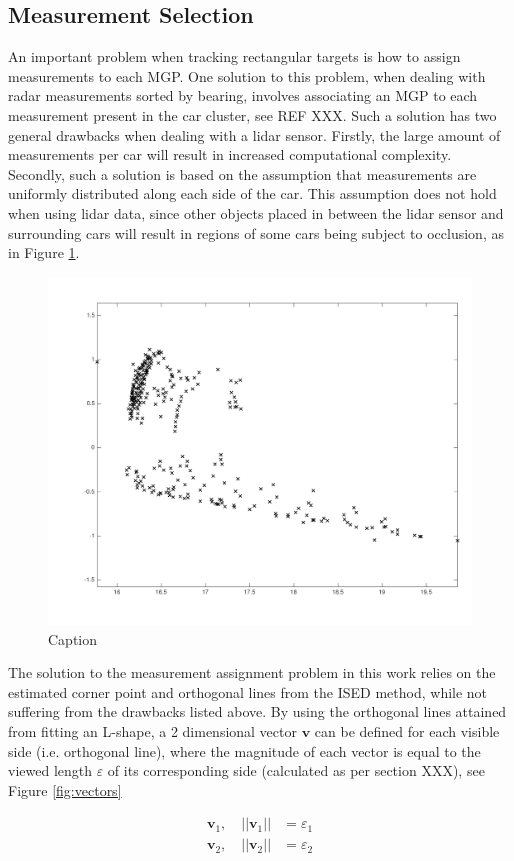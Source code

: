\subsection{Measurement Selection}
An important problem when tracking rectangular targets is how to assign measurements to each MGP. One solution to this problem, when dealing with radar measurements sorted by bearing, involves associating an MGP to each measurement present in the car cluster, see REF XXX. Such a solution has two general drawbacks when dealing with a lidar sensor. Firstly, the large amount of measurements per car will result in increased computational complexity. Secondly, such a solution is based on the assumption that measurements are uniformly distributed along each side of the car. This assumption does not hold when using lidar data, since other objects placed in between the lidar sensor and surrounding cars will result in regions of some cars being subject to occlusion, as in Figure \ref{fig:pocket}.

\begin{figure}[ht]
    \centering
    \includegraphics[width = 0.6\linewidth]{include/images/pocket.png}
    \caption{Caption}
    \label{fig:pocket}
\end{figure}

The solution to the measurement assignment problem in this work relies on the estimated corner point and orthogonal lines from the ISED method, while not suffering from the drawbacks listed above. By using the orthogonal lines attained from fitting an L-shape, a 2 dimensional vector $\mathbf{v}$ can be defined for each visible side (i.e. orthogonal line), where the magnitude of each vector is equal to the viewed length $\varepsilon$ of its corresponding side (calculated as per section XXX), see Figure \ref{fig:vectors}

\begin{align}
     \mathbf{v}_{1},\quad ||\mathbf{v}_{1}|| &= \varepsilon_{1} \\
     \mathbf{v}_{2},\quad ||\mathbf{v}_{2}|| &= \varepsilon_{2}
\end{align}


